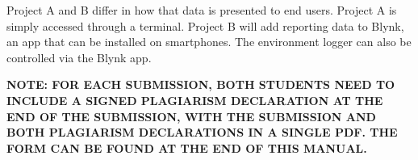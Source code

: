 Project A and B differ in how that data is presented to end users. Project A is simply accessed through a terminal. Project B will add reporting data to Blynk, an app that can be installed on smartphones. The environment logger can also be controlled via the Blynk app.

\textbf{NOTE: FOR EACH SUBMISSION, BOTH STUDENTS NEED TO INCLUDE A SIGNED PLAGIARISM DECLARATION AT THE END OF THE SUBMISSION, WITH THE SUBMISSION AND BOTH PLAGIARISM DECLARATIONS IN A SINGLE PDF. THE FORM CAN BE FOUND AT THE END OF THIS MANUAL.}






